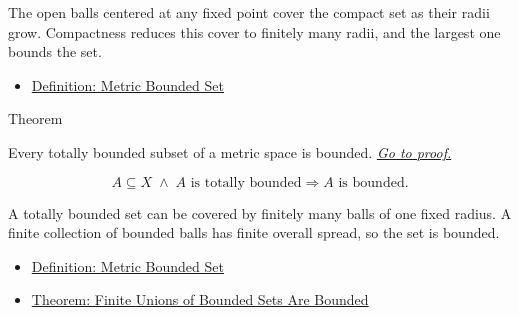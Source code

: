 \begin{remark*}[Interpretation]
The open balls centered at any fixed point cover the compact set as their
radii grow.  Compactness reduces this cover to finitely many radii, and the
largest one bounds the set.
\end{remark*}

\begin{dependencies}
\begin{itemize}
  \item \hyperref[def:metric-bounded-set]{Definition: Metric Bounded Set}
\end{itemize}
\end{dependencies}

\begin{theorembox}{Theorem}
\begin{theorem}
\label{thm:metric-totally-bounded-sets-bounded}
Every totally bounded subset of a metric space is bounded.
\hyperref[prf:metric-totally-bounded-sets-bounded]{\textit{Go to proof.}}
\end{theorem}
\end{theorembox}

\begin{remark*}
\[
A\subseteq X
\;\land\;
A\text{ is totally bounded}
\Longrightarrow
A\text{ is bounded}.
\]
\end{remark*}

\begin{remark*}[Interpretation]
A totally bounded set can be covered by finitely many balls of one fixed
radius.  A finite collection of bounded balls has finite overall spread, so
the set is bounded.
\end{remark*}

\begin{dependencies}
\begin{itemize}
  \item \hyperref[def:metric-bounded-set]{Definition: Metric Bounded Set}
  \item \hyperref[thm:metric-finite-unions-bounded-sets-bounded]{Theorem: Finite Unions of Bounded Sets Are Bounded}
\end{itemize}
\end{dependencies}

